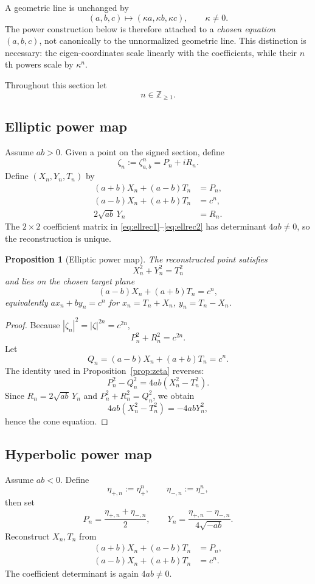 \documentclass[11pt]{amsart}
\newtheorem{proposition}[theorem]{Proposition}
\theoremstyle{remark}
\begin{document}
A geometric line is unchanged by
\[
(a,b,c)\mapsto(\kappa a,\kappa b,\kappa c),
\qquad \kappa\ne0.
\]
The power construction below is therefore attached to a \emph{chosen equation} $(a,b,c)$, not canonically to the unnormalized geometric line.  This distinction is necessary: the eigen-coordinates scale linearly with the coefficients, while their $n$th powers scale by $\kappa^n$.

Throughout this section let
\[
n\in\mathbb Z_{\ge1}.
\]

\subsection{Elliptic power map}
Assume $ab>0$.  Given a point on the signed section, define
\[
\zeta_n:=\zeta_{a,b}^n=P_n+iR_n.
\]
Define $(X_n,Y_n,T_n)$ by
\begin{align}
(a+b)X_n+(a-b)T_n&=P_n,\label{eq:ellrec1}\\
(a-b)X_n+(a+b)T_n&=c^n,\label{eq:ellrec2}\\
2\sqrt{ab}\,Y_n&=R_n.\label{eq:ellrec3}
\end{align}
The $2\times2$ coefficient matrix in \eqref{eq:ellrec1}--\eqref{eq:ellrec2} has determinant $4ab\ne0$, so the reconstruction is unique.

\begin{proposition}[Elliptic power map]\label{prop:ellpower}
The reconstructed point satisfies
\[
X_n^2+Y_n^2=T_n^2
\]
and lies on the chosen target plane
\[
(a-b)X_n+(a+b)T_n=c^n,
\]
equivalently $ax_n+by_n=c^n$ for $x_n=T_n+X_n$, $y_n=T_n-X_n$.
\end{proposition}

\begin{proof}
Because $|\zeta_n|^2=|\zeta|^{2n}=c^{2n}$,
\[
P_n^2+R_n^2=c^{2n}.
\]
Let
\[
Q_n=(a-b)X_n+(a+b)T_n=c^n.
\]
The identity used in Proposition~\ref{prop:zeta} reverses:
\[
P_n^2-Q_n^2=4ab(X_n^2-T_n^2).
\]
Since $R_n=2\sqrt{ab}\,Y_n$ and $P_n^2+R_n^2=Q_n^2$, we obtain
\[
4ab(X_n^2-T_n^2)=-4abY_n^2,
\]
hence the cone equation.
\end{proof}

\subsection{Hyperbolic power map}
Assume $ab<0$.  Define
\[
\eta_{+,n}:=\eta_+^n,
\qquad
\eta_{-,n}:=\eta_-^n,
\]
then set
\begin{equation}\label{eq:hyperPQ}
P_n=\frac{\eta_{+,n}+\eta_{-,n}}{2},
\qquad
Y_n=\frac{\eta_{+,n}-\eta_{-,n}}{4\sqrt{-ab}}.
\end{equation}
Reconstruct $X_n,T_n$ from
\begin{align}
(a+b)X_n+(a-b)T_n&=P_n,\label{eq:hyprec1}\\
(a-b)X_n+(a+b)T_n&=c^n.\label{eq:hyprec2}
\end{align}
The coefficient determinant is again $4ab\ne0$.
\end{document}
